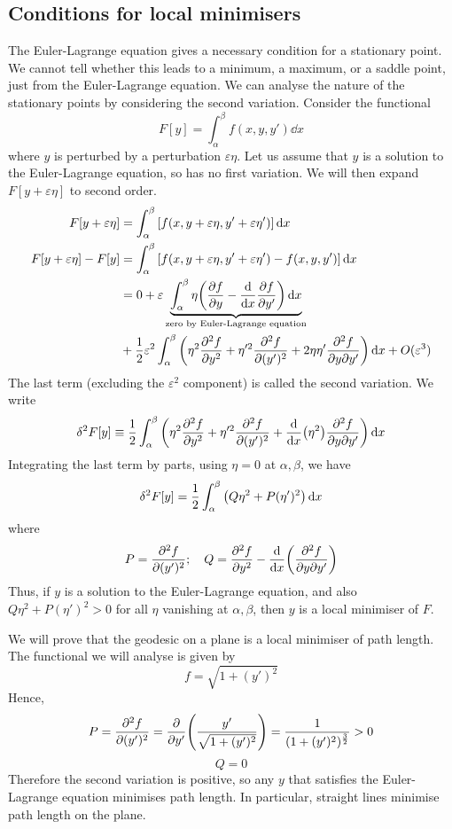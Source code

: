 \subsection{Conditions for local minimisers}
The Euler-Lagrange equation gives a necessary condition for a stationary point.
We cannot tell whether this leads to a minimum, a maximum, or a saddle point, just from the Euler-Lagrange equation.
We can analyse the nature of the stationary points by considering the second variation.
Consider the functional
\[
	F[y] = \int_\alpha^\beta f(x,y,y') \dd{x}
\]
where \( y \) is perturbed by a perturbation \( \varepsilon\eta \).
Let us assume that \( y \) is a solution to the Euler-Lagrange equation, so has no first variation.
We will then expand \( F[y+\varepsilon\eta] \) to second order.
\begin{align*}
	F[y+\varepsilon\eta]        & = \int_\alpha^\beta \qty[f(x,y+\varepsilon\eta,y'+\varepsilon\eta')] \dd{x}                                                                                  \\
	F[y+\varepsilon\eta] - F[y] & = \int_\alpha^\beta \qty[f(x,y+\varepsilon\eta,y'+\varepsilon\eta') - f(x,y,y')] \dd{x}                                                                      \\
	                            & = 0 + \varepsilon \underbrace{\int_\alpha^\beta \eta \qty( \pdv{f}{y} - \dv{x} \pdv{f}{y'} ) \dd{x}}_{\text{zero by Euler-Lagrange equation}}                \\
	                            & + \frac{1}{2} \varepsilon^2 \int_\alpha^\beta  \qty( \eta^2 \pdv[2]{f}{y} + \eta'^2 \pdv[2]{f}{(y')} + 2\eta\eta' \pdv{f}{y}{y'} ) \dd{x} + O(\varepsilon^3)
\end{align*}
The last term (excluding the \( \varepsilon^2 \) component) is called the second variation.
We write
\[
	\delta^2 F[y] \equiv \frac{1}{2}\int_\alpha^\beta \qty( \eta^2 \pdv[2]{f}{y} + \eta'^2 \pdv[2]{f}{(y')} + \dv{x} (\eta^2) \pdv{f}{y}{y'} ) \dd{x}
\]
Integrating the last term by parts, using \( \eta = 0 \) at \( \alpha, \beta \), we have
\[
	\delta^2 F[y] = \frac{1}{2}\int_\alpha^\beta \qty( Q\eta^2 + P(\eta')^2 ) \dd{x}
\]
where
\[
	P = \pdv[2]{f}{(y')};\quad Q = \pdv[2]{f}{y} - \dv{x} \qty(\pdv{f}{y}{y'})
\]
Thus, if \( y \) is a solution to the Euler-Lagrange equation, and also \( Q\eta^2 + P(\eta')^2 > 0 \) for all \( \eta \) vanishing at \( \alpha, \beta \), then \( y \) is a local minimiser of \( F \).

\begin{example}
	We will prove that the geodesic on a plane is a local minimiser of path length.
	The functional we will analyse is given by
	\[
		f = \sqrt{1 + (y')^2}
	\]
	Hence,
	\[
		P = \pdv[2]{f}{(y')} = \pdv{y'} \qty(\frac{y'}{\sqrt{1+(y')^2}}) = \frac{1}{(1+(y')^2)^{\frac{3}{2}}} > 0
	\]
	\[
		Q = 0
	\]
	Therefore the second variation is positive, so any \( y \) that satisfies the Euler-Lagrange equation minimises path length.
	In particular, straight lines minimise path length on the plane.
\end{example}

